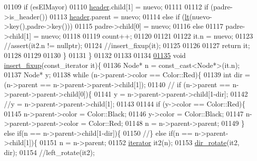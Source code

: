 \begin{DoxyCode}
01109         \textcolor{keywordflow}{if} (esElMayor)
01110             \hyperlink{classaed2_1_1map_a92d93f905c8ad73fba18fdc7e8915cce_a92d93f905c8ad73fba18fdc7e8915cce}{header}.child[1] = nuevo; 
01111         
01112         \textcolor{keywordflow}{if} (padre->is\_header())
01113             \hyperlink{classaed2_1_1map_a92d93f905c8ad73fba18fdc7e8915cce_a92d93f905c8ad73fba18fdc7e8915cce}{header}.parent = nuevo;
01114         \textcolor{keywordflow}{else} if (\hyperlink{classaed2_1_1map_a0e5be36fae0693e4665bd2a615e7550a_a0e5be36fae0693e4665bd2a615e7550a}{lt}(nuevo->key(),padre->key()))
01115             padre->child[0] = nuevo;
01116         \textcolor{keywordflow}{else}
01117             padre->child[1] = nuevo;
01118         
01119         count++;
01120     
01121     
01122         it.n = nuevo;
01123         \textcolor{comment}{//assert(it2.n != nullptr);}
01124         \textcolor{comment}{//insert\_fixup(it);}
01125      
01126         
01127         \textcolor{keywordflow}{return} it;
01128 
01129     
01130     \}
01131  \}
01132 
01133 
01134     
\hypertarget{map3_8h_source_l01135}{}\hyperlink{classaed2_1_1map_ae4e5e735407f463bade9eeab6a553c53_ae4e5e735407f463bade9eeab6a553c53}{01135} \textcolor{keywordtype}{void} \hyperlink{classaed2_1_1map_ae4e5e735407f463bade9eeab6a553c53_ae4e5e735407f463bade9eeab6a553c53}{insert_fixup}(const\_iterator it)\{
01136     Node* n = \textcolor{keyword}{const\_cast<}Node*\textcolor{keyword}{>}(it.n);
01137     Node* y;
01138     \textcolor{keywordflow}{while} (n->parent->color == Color::Red)\{
01139         \textcolor{keywordtype}{int} dir = (n->parent == n->parent->parent->child[1]);
01140     \textcolor{comment}{//  if (n->parent == n->parent->parent->child[0])\{}
01141         y = n->parent->parent->child[1-dir];
01142         \textcolor{comment}{//y = n->parent->parent->child[1];}
01143         
01144         \textcolor{keywordflow}{if} (y->color == Color::Red)\{
01145             n->parent->color = Color::Black;
01146             y->color = Color::Black;
01147             n->parent->parent->color = Color::Red;
01148             n = n->parent->parent;
01149         \} \textcolor{keywordflow}{else} \textcolor{keywordflow}{if}(n == n->parent->child[1-dir])\{
01150             \textcolor{comment}{//\} else if(n == n->parent->child[1])\{}
01151             n = n->parent;
01152             \hyperlink{classaed2_1_1iterator}{iterator} it2(n);
01153             \hyperlink{classaed2_1_1map_a94f2862ada0c9ed4f4457eac42ea8f23_a94f2862ada0c9ed4f4457eac42ea8f23}{dir_rotate}(it2, dir);
01154                 \textcolor{comment}{//left\_rotate(it2);}

\end{DoxyCode}
